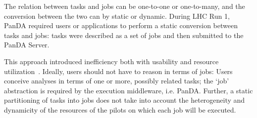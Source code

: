 





The relation between tasks and jobs can be one-to-one or one-to-many, and the
conversion between the two can by static or dynamic. During LHC Run 1, PanDA
required users or applications to perform a static conversion between tasks and
jobs: tasks were described as a set of jobs
and then submitted to the PanDA Server.

This approach introduced inefficiency both with usability and resource
utilization~\cite{borodin2015unified}. Ideally, users should not have to reason
in terms of jobs: Users conceive analyses in terms of one or more, possibly
related tasks; the `job' abstraction is required by the execution middleware,
i.e. PanDA. Further, a static partitioning of tasks into jobs does not take into
account the heterogeneity and dynamicity of the resources of the pilots on which
each job will be executed.

